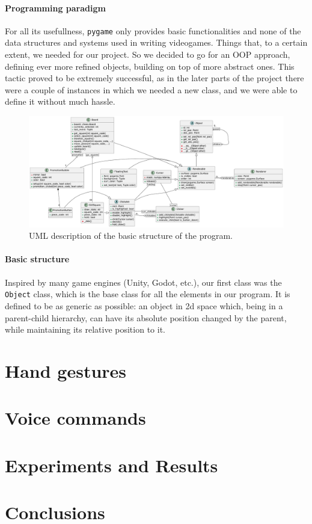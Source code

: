 \documentclass[a4paper, 11pt, twocolumn]{IEEEtran}
\begin{document}
    \paragraph*{Programming paradigm} For all its usefullness, \texttt{pygame} only provides basic functionalities and none of the data structures and systems used in writing videogames. Things that, to a certain extent, we needed for our project. So we decided to go for an OOP approach, defining ever more refined objects, building on top of more abstract ones. This tactic proved to be extremely successful, as in the later parts of the project there were a couple of instances in which we needed a new class, and we were able to define it without much hassle.
    \begin{figure}\label{fig:uml}
        \centering
        \includegraphics[width=.8\textwidth]{uml.pdf}
        \caption{UML description of the basic structure of the program.}
    \end{figure}
    \paragraph*{Basic structure} Inspired by many game engines (Unity, Godot, etc.), our first class was the \texttt{Object} class, which is the base class for all the elements in our program. It is defined to be as generic as possible: an object in 2d space which, being in a parent-child hierarchy, can have its absolute position changed by the parent, while maintaining its relative position to it.

    \section{Hand gestures}

    \section{Voice commands}

    \section{Experiments and Results}

    \section{Conclusions}
\end{document}
